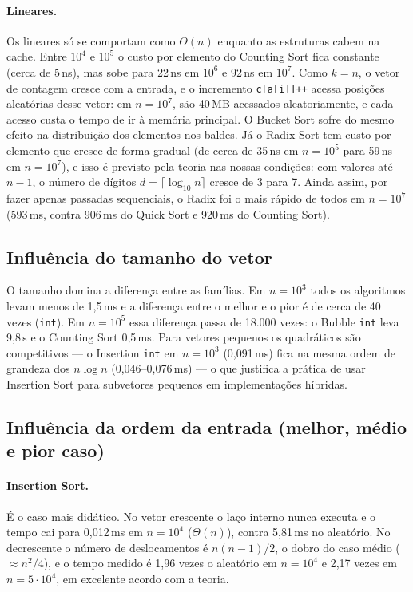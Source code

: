 \documentclass[11pt,a4paper]{article}
\begin{document}
\paragraph{Lineares.} Os lineares só se comportam como $\Theta(n)$ enquanto as estruturas cabem na
cache. Entre $10^4$ e $10^5$ o custo por elemento do Counting Sort fica constante (cerca de 5\,ns),
mas sobe para 22\,ns em $10^6$ e 92\,ns em $10^7$. Como $k=n$, o vetor de contagem cresce com a
entrada, e o incremento \texttt{c[a[i]]++} acessa posições aleatórias desse vetor: em $n=10^7$, são
40\,MB acessados aleatoriamente, e cada acesso custa o tempo de ir à memória principal. O Bucket
Sort sofre do mesmo efeito na distribuição dos elementos nos baldes. Já o Radix Sort tem custo por
elemento que cresce de forma gradual (de cerca de 35\,ns em $n=10^5$ para 59\,ns em $n=10^7$), e isso é previsto pela teoria nas nossas
condições: com valores até $n-1$, o número de dígitos $d = \lceil\log_{10} n\rceil$ cresce de 3 para 7.
Ainda assim, por fazer apenas passadas sequenciais, o Radix foi o mais rápido de todos em $n=10^7$
(593\,ms, contra 906\,ms do Quick Sort e 920\,ms do Counting Sort).

\subsection{Influência do tamanho do vetor}

O tamanho domina a diferença entre as famílias. Em $n=10^3$ todos os algoritmos levam menos de
1,5\,ms e a diferença entre o melhor e o pior é de cerca de 40 vezes (\texttt{int}). Em $n=10^5$
essa diferença passa de 18.000 vezes: o Bubble \texttt{int} leva 9,8\,s e o Counting Sort 0,5\,ms.
Para vetores pequenos os quadráticos são competitivos --- o Insertion \texttt{int} em $n=10^3$ (0,091\,ms)
fica na mesma ordem de grandeza dos $n\log n$ (0,046--0,076\,ms) --- o que justifica a prática de usar
Insertion Sort para subvetores pequenos em implementações híbridas.

\subsection{Influência da ordem da entrada (melhor, médio e pior caso)}

\paragraph{Insertion Sort.} É o caso mais didático. No vetor crescente o laço interno nunca executa
e o tempo cai para 0,012\,ms em $n=10^4$ ($\Theta(n)$), contra 5,81\,ms no aleatório. No decrescente
o número de deslocamentos é $n(n-1)/2$, o dobro do caso médio ($\approx n^2/4$), e o tempo medido é
1,96 vezes o aleatório em $n=10^4$ e 2,17 vezes em $n=5\cdot10^4$, em excelente acordo com a teoria.
\end{document}
